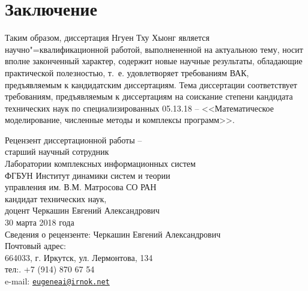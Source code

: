 \documentclass[12pt]{extarticle}
\begin{document}
\section*{Заключение}
\label{sec-conc}


Таким образом, диссертация Нгуен Тху Хыонг является
научно"=квалификационной работой, выполнененной на актуальною тему, носит вполне законченный характер, содержит новые научные результаты, обладающие практической полезностью, т.~е. удовлетворяет требованиям ВАК, предъявляемым к кандидатским диссертациям.  Тема диссертации соответствует требованиям, предъявляемым к диссертациям на соискание степени кандидата технических наук по специализированных 05.13.18 -- <<Математическое моделирование, численные методы и комплексы программ>>.



\vspace{2em}
\noindent{}Рецензент диссертационной работы --\\
старший научный сотрудник\\
Лаборатории комплексных информационных систем\\
ФГБУН Институт динамики систем и теории\\
управления им. В.М. Матросова СО РАН\\
кандидат технических наук,\\
доцент \hfil Черкашин Евгений Александрович\linebreak{}{}\\[0.5em]
30 марта 2018 года\\[0.5em]

\noindent{}Сведения о рецензенте: Черкашин Евгений Александрович\\[0.5em]
Почтовый адрес:\\
664033, г. Иркутск, ул. Лермонтова, 134\\[0.2em]
тел:. +7 (914) 870 67 54\\[0.2em]
e-mail: \href{mailto:eugeneai@irnok.net}{\nolinkurl{eugeneai@irnok.net}}
\end{document}
